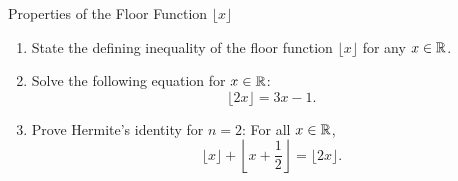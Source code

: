 \begin{exercise}{Properties of the Floor Function $\lfloor x \rfloor$}
\begin{enumerate}[leftmargin=1.5em,itemsep=2pt]
  \item State the defining inequality of the floor function $\lfloor x \rfloor$ for any $x \in \mathbb{R}$.
  \item Solve the following equation for $x \in \mathbb{R}$:
  \[
  \lfloor 2x \rfloor = 3x - 1.
  \]
  \item Prove Hermite's identity for $n = 2$: For all $x \in \mathbb{R}$,
  \[
  \lfloor x \rfloor + \left\lfloor x + \frac{1}{2} \right\rfloor = \lfloor 2x \rfloor.
  \]
\end{enumerate}
\end{exercise}

\begin{tabletworkspace}[5.0cm]
\end{tabletworkspace}

